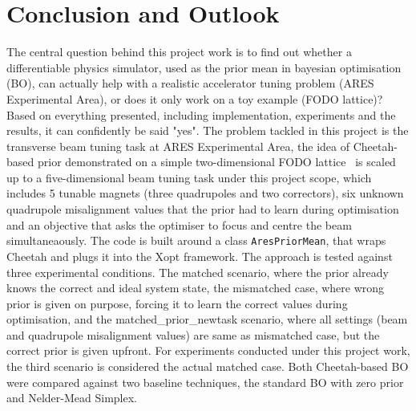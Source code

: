 \section{Conclusion and Outlook}

The central question behind this project work is to find out whether a differentiable physics simulator, 
used as the prior mean in bayesian optimisation (BO), can actually help with a realistic accelerator tuning problem (ARES Experimental Area), 
or does it only work on a toy example (FODO lattice)? Based on everything presented, including implementation, experiments and the results, it can confidently be said "yes".
The problem tackled in this project is the transverse beam tuning task
at ARES Experimental Area, the idea of Cheetah-based prior demonstrated on a simple two-dimensional FODO lattice~\cite{kaiser2024bridging} 
is scaled up to a five-dimensional beam tuning task under this project scope, which includes 5 tunable magnets (three quadrupoles and two correctors), six unknown quadrupole
misalignment values that the prior had to learn during optimisation and an objective that asks the
optimiser to focus and centre the beam simultaneaously. 
The code is built around a class \texttt{AresPriorMean}, that
wraps Cheetah and plugs it into the Xopt framework. The approach is tested against three experimental conditions. The matched scenario, where
the prior already knows the correct and ideal system state, the mismatched case, where wrong prior is given on purpose, 
forcing it to learn  the correct values during optimisation, and the matched\_prior\_newtask
scenario, where all settings (beam and  quadrupole misalignment values) are same as mismatched case, but the correct prior is given upfront. For experiments conducted under this project work, the third scenario is considered the actual matched case.
Both Cheetah-based BO were compared against two baseline techniques, the standard BO with zero prior and Nelder-Mead Simplex. 

